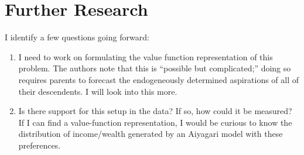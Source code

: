 \documentclass[11pt]{article}
\begin{document}
    \section{Further Research}
    I identify a few questions going forward:
    \begin{enumerate}
        \item I need to work on formulating the value function representation of this problem. The authors note that this is ``possible but complicated;'' doing so requires parents to forecast the endogeneously determined aspirations of all of their descendents. I will look into this more.
        \item Is there support for this setup in the data? If so, how could it be measured? If I can find a value-function representation, I would be curious to know the distribution of income/wealth generated by an Aiyagari model with these preferences. 
    \end{enumerate}
\end{document}
